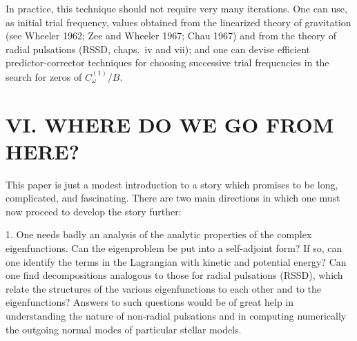 In practice, this technique should not require very many iterations. One can use, as initial trial frequency, values obtained from the linearized theory of gravitation (see Wheeler 1962; Zee and Wheeler 1967; Chau 1967) and from the theory of radial pulsations (RSSD, chaps.\ iv and vii); and one can devise efficient predictor-corrector techniques for choosing successive trial frequencies in the search for zeros of $C_\omega^{(1)}/B$.

\section*{VI. WHERE DO WE GO FROM HERE?}

This paper is just a modest introduction to a story which promises to be long, complicated, and fascinating. There are two main directions in which one must now proceed to develop the story further:

1. One needs badly an analysis of the analytic properties of the complex eigenfunctions. Can the eigenproblem be put into a self-adjoint form? If so, can one identify the terms in the Lagrangian with kinetic and potential energy? Can one find decompositions analogous to those for radial pulsations (RSSD), which relate the structures of the various eigenfunctions to each other and to the eigenfunctions? Answers to such questions would be of great help in understanding the nature of non-radial pulsations and in computing numerically the outgoing normal modes of particular stellar models.
